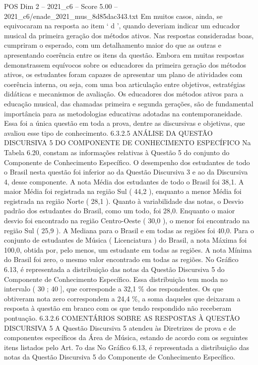 \begin{textsample}{POS Dim 2 – 2021\_c6 – Score 5.00 – 2021\_c6/enade\_2021\_mus\_8d85dac343.txt}
Em muitos casos, ainda, se equivocaram na resposta ao item ‘ d ’, quando deveriam indicar um educador musical da primeira geração dos métodos ativos.
Nas respostas consideradas boas, cumpriram o esperado, com um detalhamento maior do que as outras e apresentando coerência entre os itens da questão.
Embora em muitas respostas demonstrassem equívocos sobre os educadores da primeira geração dos métodos ativos, os estudantes foram capazes de apresentar um plano de atividades com coerência interna, ou seja, com uma boa articulação entre objetivos, estratégias didáticas e mecanismos de avaliação.
Os educadores dos métodos ativos para a educação musical, das chamadas primeira e segunda gerações, são de fundamental importância para as metodologias educativas adotadas na contemporaneidade.
Essa foi a única questão em toda a prova, dentre as discursivas e objetivas, que avaliou esse tipo de conhecimento. 6.3.2.5 ANÁLISE DA QUESTÃO DISCURSIVA 5 DO COMPONENTE DE CONHECIMENTO ESPECÍFICO Na Tabela 6.20, constam as informações relativas à Questão 5 do conjunto do Componente de Conhecimento Específico.
O desempenho dos estudantes de todo o Brasil nesta questão foi inferior ao da Questão Discursiva 3 e ao da Discursiva 4, desse componente.
A nota Média dos estudantes de todo o Brasil foi 38,1.
A maior Média foi registrada na região Sul ( 44,2 ), enquanto a menor Média foi registrada na região Norte ( 28,1 ).
Quanto à variabilidade das notas, o Desvio padrão dos estudantes do Brasil, como um todo, foi 28,0.
Enquanto o maior desvio foi encontrado na região Centro-Oeste ( 30,0 ), o menor foi encontrado na região Sul ( 25,9 ).
A Mediana para o Brasil e em todas as regiões foi 40,0.
Para o conjunto de estudantes de Música ( Licenciatura ) do Brasil, a nota Máxima foi 100,0, obtida por, pelo menos, um estudante em todas as regiões.
A nota Mínima do Brasil foi zero, o mesmo valor encontrado em todas as regiões.
No Gráfico 6.13, é representada a distribuição das notas da Questão Discursiva 5 do Componente de Conhecimento Específico.
Essa distribuição tem moda no intervalo ( 30 ; 40 ], que corresponde a 32,1 \% dos respondentes.
Os que obtiveram nota zero correspondem a 24,4 \%, a soma daqueles que deixaram a resposta à questão em branco com os que tendo respondido não receberam pontuação. 6.3.2.6 COMENTÁRIOS SOBRE AS RESPOSTAS À QUESTÃO DISCURSIVA 5 A Questão Discursiva 5 atendeu às Diretrizes de prova e de componentes específicos da Área de Música, estando de acordo com os seguintes itens listados pelo Art. 7o das No Gráfico 6.13, é representada a distribuição das notas da Questão Discursiva 5 do Componente de Conhecimento Específico.

\end{textsample}
